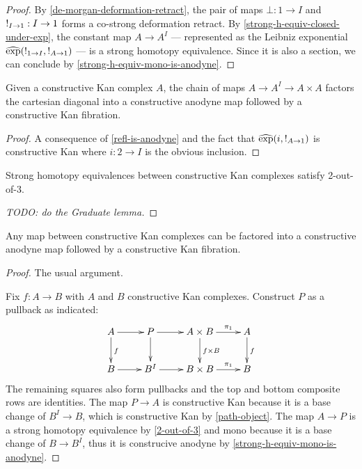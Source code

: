\documentclass[reqno,10pt,a4paper,oneside]{amsart}
\begin{document}
\begin{proof}
By \cref{de-morgan-deformation-retract}, the pair of maps $\bot : 1 \to I$ and $\mathord{!}_{I \to 1} : I \to 1$ forms a co-strong deformation retract.
By \cref{strong-h-equiv-closed-under-exp}, the constant map $A \to A^I$ --- represented as the Leibniz exponential $\operatorname{\widehat{exp}}(\mathord{!}_{1 \to I}, \mathord{!}_{A \to 1})$ --- is a strong homotopy equivalence.
Since it is also a section, we can conclude by \cref{strong-h-equiv-mono-is-anodyne}.
\end{proof}

\begin{corollary}
\label{path-object}
Given a constructive Kan complex $A$, the chain of maps $A \to A^I \to A \times A$ factors the cartesian diagonal into a constructive anodyne map followed by a constructive Kan fibration.
\end{corollary}

\begin{proof}
A consequence of \cref{refl-is-anodyne} and the fact that $\operatorname{\widehat{exp}}(i, \mathord{!}_{A \to 1})$ is constructive Kan where $i : 2 \to I$ is the obvious inclusion.
\end{proof}

\begin{lemma}
\label{2-out-of-3}
Strong homotopy equivalences between constructive Kan complexes satisfy 2-out-of-3. 
\end{lemma}

\begin{proof}
[TODO: do the Graduate lemma] 
\end{proof}

\begin{proposition}
\label{fibrant-cod-factorization}
Any map between constructive Kan complexes can be factored into a constructive anodyne map followed by a constructive Kan fibration.
\end{proposition}

\begin{proof}
The usual argument.

Fix $f : A \to B$ with $A$ and $B$ constructive Kan complexes.
Construct $P$ as a pullback as indicated:
\[
\xymatrix{
  A
  \ar[r]
  \ar[d]^{f}
&
  P
  \ar[r]
  \ar[d]
&
  A \times B
  \ar[r]^-{\pi_1}
  \ar[d]^{f \times B}
&
  A
  \ar[d]^{f}
\\
  B
  \ar[r]
&
  B^I
  \ar[r]
&
  B \times B
  \ar[r]^-{\pi_1}
&
  B
}
\]
The remaining squares also form pullbacks and the top and bottom composite rows are identities.
The map $P \to A$ is constructive Kan because it is a base change of $B^I \to B$, which is constructive Kan by \cref{path-object}.
The map $A \to P$ is a strong homotopy equivalence by \cref{2-out-of-3} and mono because it is a base change of $B \to B^I$, thus it is construcive anodyne by \cref{strong-h-equiv-mono-is-anodyne}.
\end{proof}
\end{document}
